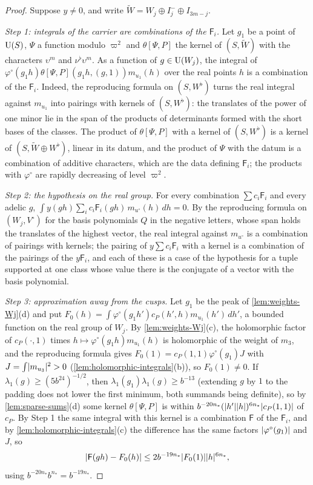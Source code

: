 \begin{proof}
Suppose $y\ne0$, and write $\tilde W=W_j\oplus I_j^-\oplus I_{3m-j}$.

\emph{Step 1: integrals of the carrier are combinations of the $\mathsf F_i$.} Let $g_1$ be a point of $\operatorname{U}(S)$, $\Psi$ a function modulo $\varpi^2$ and $\theta[\Psi,P]$ the kernel of $(S,\tilde W)$ with the characters $\upsilon^m$ and $\nu^\flat\upsilon^m$. As a
function of $g\in\operatorname{U}(W_j)$, the integral of $\varphi^\circ(g_1h)\theta[\Psi,P](g_1h,(g,1))m_{u_1}(h)$ over the real points $h$ is a combination of the $\mathsf F_i$. Indeed, the reproducing formula on $(S,W^\flat)$ turns the real integral against $m_{u_1}$ into pairings
with kernels of $(S,W^\flat)$: the translates of the power of one minor lie in the span of the products of determinants formed with the short bases of the classes. The product of $\theta[\Psi,P]$ with a kernel of $(S,W^\flat)$ is a kernel of
$(S,\tilde W\oplus W^\flat)$, linear in its datum, and the product of $\Psi$ with the datum is a combination of additive characters, which are the data defining $\mathsf F_i$; the products with $\varphi^\circ$ are rapidly decreasing of level $\varpi^2$.

\emph{Step 2: the hypothesis on the real group.} For every combination $\sum c_i\mathsf F_i$ and every adelic $g$, $\int y(gh)\sum_ic_i\mathsf F_i(gh)\,m_{u^\circ}(h)\,dh=0$. By the reproducing formula on $(W_j,V^\circ)$ for the basis polynomials $Q$ in the negative letters,
whose span holds the translates of the highest vector, the real integral against $m_{u^\circ}$ is a combination of pairings with kernels; the pairing of $y\sum c_i\mathsf F_i$ with a kernel is a combination of the pairings of the $y\mathsf F_i$, and each of these is a
case of the hypothesis for a tuple supported at one class whose value there is the conjugate of a vector with the basis polynomial.

\emph{Step 3: approximation away from the cusps.} Let $g_1$ be the peak of \cref{lem:weights-Wj}(d) and put $F_0(h)=\int\varphi^\circ(g_1h')c_P(h',h)m_{u_1}(h')\,dh'$, a bounded function on the real group of $W_j$. By \cref{lem:weights-Wj}(c), the holomorphic factor of $c_P(\cdot,1)$ times
$h\mapsto\varphi^\circ(g_1h)m_{u_1}(h)$ is holomorphic of the weight of $m_3$, and the reproducing formula gives $F_0(1)=c_P(1,1)\varphi^\circ(g_1)J$ with $J=\int\lvert m_{u_3}\rvert^2>0$ (\cref{lem:holomorphic-integrals}(b)), so $F_0(1)\ne0$. If $\lambda_1(g)\ge(5b^{24})^{-1/2}$, then $\lambda_1(g_1)\lambda_1(g)\ge b^{-13}$ (extending $g$ by $1$ to the padding does not lower the first minimum, both summands being
definite), so by \cref{lem:sparse-sums}(d) some kernel $\theta[\Psi,P]$ is within $b^{-20n_*}(\lvert h'\rvert\lvert h\rvert)^{6n_*}\lvert c_P(1,1)\rvert$ of $c_P$. By Step 1 the same integral with this kernel is a combination $\mathsf F$ of the $\mathsf F_i$, and by \cref{lem:holomorphic-integrals}(c) the
difference has the same factors $\lvert \varphi^\circ(g_1)\rvert$ and $J$, so
\[
  \lvert \mathsf F(gh)-F_0(h)\rvert\le2b^{-19n_*}\lvert F_0(1)\rvert\lvert h\rvert^{6n_*},
\]
using $b^{-20n_*}b^{n_*}=b^{-19n_*}$.


\end{proof}
